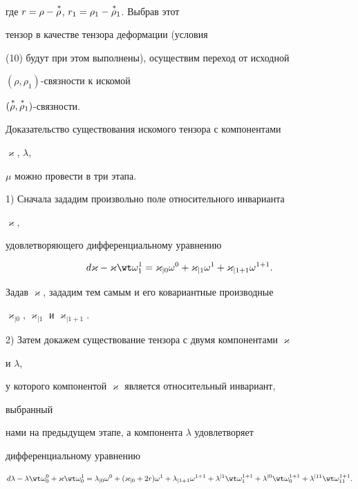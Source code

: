где $r=\rho-\overset{\,*}{\rho}{}$, $r_1=\rho_1-\overset{\,*}{\rho}{}_1$. Выбрав этот 


тензор в качестве тензора деформации (условия 


(10) будут при этом выполнены), осуществим переход от исходной 


$(\rho,\rho_1)$-связности к искомой 


$(\overset{\,*}{\rho}{},\overset{\,*}{\rho}{}_1)$-связности. 


 


Доказательство существования искомого тензора с компонентами 


$\varkappa$, $\lambda$, 


$\mu$ можно провести в три этапа. 


 


1) Сначала зададим произвольно поле относительного инварианта 


$\varkappa$, 


удовлетворяющего дифференциальному уравнению 


$$ 


d\varkappa-\varkappa\wt\omega^1_1=\varkappa_{|0}\omega^0+ 


\varkappa_{|1}\omega^1+\varkappa_{|1+1}\omega^{1+1}. 


$$ 


Задав $\varkappa$, зададим тем самым и его ковариантные производные 


$\varkappa_{|0}$, $\varkappa_{|1}$ и $\varkappa_{|1+1}$. 


 


2) Затем докажем существование тензора с двумя компонентами $\varkappa$ 


и $\lambda$, 


у которого компонентой $\varkappa$ является относительный инвариант, 


выбранный 


нами на предыдущем этапе, а компонента $\lambda$ удовлетворяет 


дифференциальному уравнению 


\begin{equation} 


d\lambda-\lambda\wt\omega^0_0+\varkappa\wt\omega^1_0= 


\lambda_{|0}\omega^0+(\varkappa_{|0}+2r)\omega^1+ 


\lambda_{|1+1}\omega^{1+1}+\lambda^{|1} 


\wt\omega^{1+1}_1+\lambda^{|0}\wt\omega^{1+1}_0+ 


\lambda^{|11}\wt\omega^{1+1}_{11}. 


\end{equation}  


